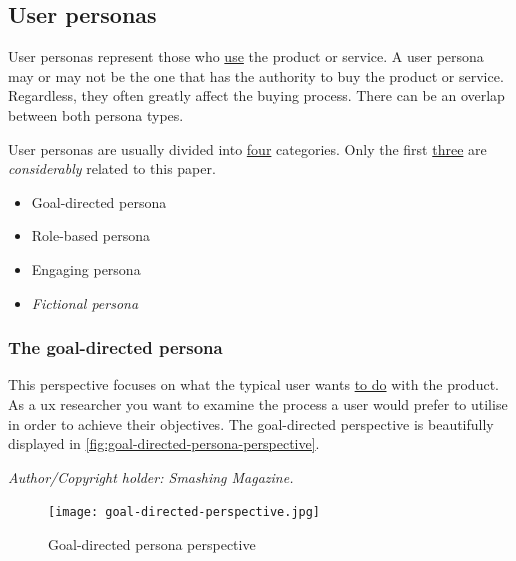     \subsection{User personas}
    User personas represent those who \underline{use} the product or service. A user persona may or may not be the one that has the authority to buy the product or service. Regardless, they often greatly affect the buying process. There can be an overlap between both persona types.
    
    User personas are usually divided into \underline{four} categories. Only the first \underline{three} are \textit{considerably} related to this paper.

    \begin{itemize}
        \item{Goal-directed persona}
        \item{Role-based persona}
        \item{Engaging persona}
        \item{\textit{Fictional persona}}
    \end{itemize}
    
    \subsubsection{The goal-directed persona}
        This perspective focuses on what the typical user wants \underline{to do} with the product. As a \gls{ux} researcher you want to examine the process a user would prefer to utilise in order to achieve their objectives. The goal-directed perspective is beautifully displayed in \autoref{fig:goal-directed-persona-perspective}. 
        
       \begin{center} 
        \textit{Author/Copyright holder: Smashing Magazine.}
       \end{center} 
       
        \begin{figure}[h]
            \centering
            \texttt{[image: goal-directed-perspective.jpg]}
            \caption{Goal-directed persona perspective}
            \label{fig:goal-directed-persona-perspective}
        \end{figure}
